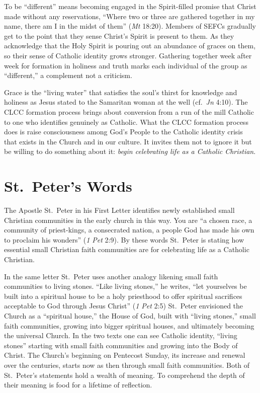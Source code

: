 \documentclass{article}
\begin{document}
To be ``different'' means becoming engaged in the Spirit-filled promise that
Christ made without any reservations, ``Where two or three are gathered together
in my name, there am I in the midst of them'' (\emph{Mt} 18:20). Members of
SEFCs gradually get to the point that they sense Christ's Spirit is present to
them. As they acknowledge that the Holy Spirit is pouring out an abundance of
graces on them, so their sense of Catholic identity grows stronger. Gathering
together week after week for formation in holiness and truth marks each
individual of the group as ``different,'' a complement not a criticism.

Grace is the ``living water'' that satisfies the soul's thirst for knowledge and
holiness as Jesus stated to the Samaritan woman at the well (cf.\ \emph{Jn}
4:10). The CLCC formation process brings about conversion from a run of the mill
Catholic to one who identifies genuinely as Catholic. What the CLCC formation
process does is raise consciousness among God's People to the Catholic identity
crisis that exists in the Church and in our culture. It invites them not to
ignore it but be willing to do something about it: \emph{begin celebrating life
as a Catholic Christian}.


\section{St.\ Peter's Words}

The Apostle St.\ Peter in his First Letter identifies newly established small
Christian communities in the early church in this way. You are ``a chosen race,
a community of priest-kings, a consecrated nation, a people God has made his own
to proclaim his wonders'' (\emph{1 Pet} 2:9). By these words St.\ Peter is
stating how essential small Christian faith communities are for celebrating life
as a Catholic Christian.

In the same letter St.\ Peter uses another analogy likening small faith
communities to living stones. ``Like living stones,'' he writes, ``let
yourselves be built into a spiritual house to be a holy priesthood to offer
spiritual sacrifices acceptable to God through Jesus Christ'' (\emph{1 Pet} 2:5)
St.\ Peter envisioned the Church as a ``spiritual house,'' the House of God,
built with ``living stones,'' small faith communities, growing into bigger
spiritual houses, and ultimately becoming the universal Church. In the two texts
one can see Catholic identity, ``living stones'' starting with small faith
communities and growing into the Body of Christ. The Church's beginning on
Pentecost Sunday, its increase and renewal over the centuries, starts now as
then through small faith communities. Both of St.\ Peter's statements hold a
wealth of meaning. To comprehend the depth of their meaning is food for a
lifetime of reflection.
\end{document}
